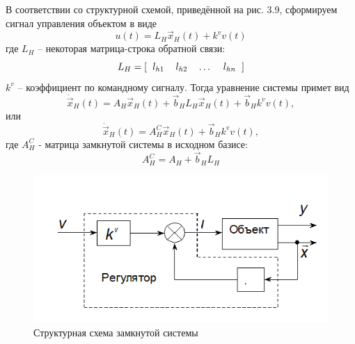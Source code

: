 В соответствии со структурной схемой, приведённой на рис. 3.9, сформируем сигнал управления объектом в виде
\begin{equation}
	u(t) = L_H\vec{x}_H(t) + k^vv(t)
\end{equation}
где $L_H$ – некоторая матрица-строка обратной связи:
\begin{equation}
	L_H = [\begin{tabular}{ l l l l }
		  	$l_{h1}$ & $l_{h2}$ & $\dots$ & $l_{hn}$
		  \end{tabular}]
\end{equation}
$k^v$ – коэффициент по командному сигналу.
Тогда уравнение системы примет вид
\begin{equation}
	\dot{\vec{x}}_H(t)=A_H\vec{x}_H(t)+\vec{b}_HL_H\vec{x}_H(t)+\vec{b}_Hk^vv(t),
\end{equation}
или
\begin{equation}
	\dot{\vec{x}}_H(t)=A_H^C\vec{x}_H(t)+\vec{b}_Hk^vv(t),
\end{equation}
где $A_H^C$ - матрица замкнутой системы в исходном базисе:
\begin{equation}
	A_H^C=A_H+\vec{b}_HL_H
\end{equation}

\begin{figure}[H]
	\centering
	\includegraphics[scale=0.9]{images/Fig3_9}
	\caption{Структурная схема замкнутой системы}
\end{figure}

